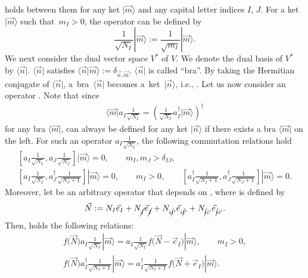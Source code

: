 \documentclass[10pt,a4paper]{amsart}
\numberwithin{equation}{section}
\begin{document}
holds between them for any ket
$
|
\vec{m}
\rangle
$
and any capital letter indices $I$, $J$. For a ket
$
|
\vec{m}
\rangle
$
such that~${m_{I}>0}$, the operator
can be defined by
\[
 \frac{1}{
 \sqrt{N_{I}}
 }
|
 \vec{m}
\rangle
 :=
 \frac{1}{
 \sqrt{m_{I}}
 }
|
 \vec{m}
\rangle
.
\]
We next consider the dual vector space $V^{\ast}$ of $V$. We denote the dual basis of $V^{\ast}$ by
$
\langle
\vec{n}
|
$.
$
\langle
\vec{n}
|
$
satisfies
$
\langle
\vec{n}
|
\vec{m}
\rangle
:=
\delta_{
\vec{n},
\vec{m}
}
$.
$
\langle
\vec{n}
|
$
is called ``bra''.
By taking the Hermitian conjugate of
$
\langle
\vec{n}
|
$,
a~bra~$
\langle
\vec{n}
|
$
becomes a~ket~$
|
\vec{n}
\rangle
$,
i.e.,
.
Let us now consider an operator
.
Note that since
\begin{align*}
\langle
\vec{m}
|
a_{I}
\frac{1}{
\sqrt{N_{I}}
}
=
 \left(
\frac{1}{
\sqrt{N_{I}}
}
a_{I}^{\dagger}
|
\vec{m}
\rangle
 \right)^{\dagger}
\end{align*}
for any bra
$
\langle
\vec{m}
|
$,
can always be defined for any ket
$
|
\vec{n}
\rangle
$
if there exists a bra
$
\langle
\vec{m}
|
$
on the left. For such an operator
$
a_{I}
\frac{1}{
\sqrt{N_{I}}
}
$,
the following commutation relations hold
\begin{gather*}
 \left[
 a_{I}
 \frac{1}{
 \sqrt{N_{I}}
 },
 a_{J}
 \frac{1}{
 \sqrt{N_{J}}
 }
 \right]
|
 \vec{m}
\rangle
 =
 0,
 \qquad
 m_{I},
 m_{J}
 >
 \delta_{IJ}
 ,\nonumber
 \\
 \left[
 a_{I}
 \frac{1}{
 \sqrt{N_{I}}
 },
 a_{J}^{\dagger}
 \frac{1}{
 \sqrt{N_{J}+1}
 }
 \right]
|
 \vec{m}
\rangle
 =
 0,
 \qquad
 m_{I}>0,
 \qquad
 \left[
 a_{I}^{\dagger}
 \frac{1}{
 \sqrt{N_{I}+1}
 },
 a_{J}^{\dagger}
 \frac{1}{
 \sqrt{N_{J}+1}
 }
 \right]
|
 \vec{m}
\rangle
 =
 0.
\end{gather*}
Moreover, let  be an arbitrary operator that depends on , where  is defined by
\begin{align*}
\vec{N}
:=
N_{I}%
\vec{e}_{I}
+
N_{\cancel{I}}%
\vec{e}_{\cancel{I}}
+
N_{i\cancel{i}'}%
\vec{e}_{i\cancel{i}'}
+
N_{\cancel{i}i'}
\vec{e}_{\cancel{i}i'}
.
\end{align*}
Then,  holds the following relations:
\begin{gather}
f\bigl(\vec{N}\bigr)
a_{I}
\frac{1}{
\sqrt{N_{I}}
}
|
\vec{m}
\rangle
=
a_{I}
\frac{1}{
\sqrt{N_{I}}
}
f\bigl(
\vec{N}
-
\vec{e}_{I}
\bigr)
|
\vec{m}
\rangle,
\qquad
m_{I}>0,
\label{relation_num_opr_fct1}
\\
f\bigl(\vec{N}\bigr)
a_{I}^{\dagger}
\frac{1}{
\sqrt{N_{I}+1}
}
|
\vec{m}
\rangle
=
a_{I}^{\dagger}
\frac{1}{
\sqrt{N_{I}+1}
}
f
\bigl(
\vec{N}
+
\vec{e}_{I}
\bigr)
|
\vec{m}
\rangle.\label{relation_num_opr_fct2}
\end{gather}
\end{document}
